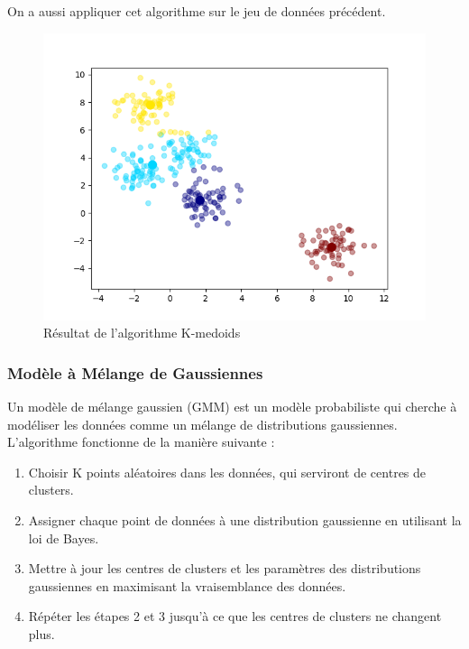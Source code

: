 \documentclass[french,a4paper,18pt]{article}
\begin{document}
On a aussi appliquer cet algorithme sur le jeu de données précédent.
\begin{figure}[h!]
    \centering
    \includegraphics[scale=0.5]{images/short_simulation_kmedoids.png}
    \caption{Résultat de l'algorithme K-medoids}\label{fig:short_simulation_kmedoids}
\end{figure}

\subsubsection{Modèle à Mélange de Gaussiennes}

Un modèle de mélange gaussien (GMM) est un modèle probabiliste qui cherche à modéliser les données comme un mélange de distributions gaussiennes.
L'algorithme fonctionne de la manière suivante :
\begin{enumerate}
    \item Choisir K points aléatoires dans les données, qui serviront de centres de clusters.
    \item Assigner chaque point de données à une distribution gaussienne en utilisant la loi de Bayes.
    \item Mettre à jour les centres de clusters et les paramètres des distributions gaussiennes en maximisant la vraisemblance des données.
    \item Répéter les étapes 2 et 3 jusqu'à ce que les centres de clusters ne changent plus.
\end{enumerate}
\end{document}
